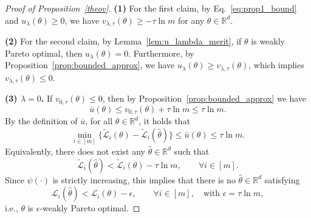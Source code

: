 \documentclass[sigconf]{acmart}
\begin{document}
\begin{proof}[Proof of Proposition~\ref{theov}]
\noindent\textbf{(1)} For the first claim, by Eq.~\eqref{eq:prop1_bound} and $u_\lambda(\theta)\geq 0$, we have $v_{\lambda,\tau}(\theta) \ge -\tau \ln m$ for any $\theta \in \mathbb{R}^d$. 

\noindent\textbf{(2)} For the second claim, by Lemma~\ref{lem:u_lambda_merit}, if $\theta$ is weakly Pareto optimal, then $u_{\lambda}(\theta)=0$. Furthermore, by Proposition~\ref{prop:bounded_approx}, we have $u_{\lambda}(\theta)\ge v_{\lambda,\tau}(\theta)$, which implies $v_{\lambda,\tau}(\theta)\le 0$.




\noindent\textbf{(3) $\lambda=0$.} If $v_{0,\tau}(\theta)\le 0$, then by Proposition~\ref{prop:bounded_approx} we have
\begin{equation}
\label{eq:prop2_casea_1}
\bar{u}(\theta) \le v_{0,\tau}(\theta)+\tau\ln m \le \tau\ln m.
\end{equation}
By the definition of $\bar{u}$, for all $\hat{\theta}\in \mathbb{R}^d$, it holds that
\begin{equation}
\label{eq:prop2_casea_2}
\min_{i\in[m]} \bigl\{\tilde{\mathcal{L}}_i(\theta)-\tilde{\mathcal{L}}_i(\hat{\theta})\bigr\} \le \bar{u}(\theta) \le \tau\ln m.
\end{equation}
Equivalently, there does not exist any $\hat{\theta}\in \mathbb{R}^d$ such that
\[
\tilde{\mathcal{L}}_i(\hat{\theta}) < \tilde{\mathcal{L}}_i(\theta) - \tau\ln m, \qquad \forall i\in[m].
\]
Since $\psi(\cdot)$ is strictly increasing, this implies that there is no $\hat{\theta}\in \mathbb{R}^d$ satisfying
\[
\mathcal{L}_i(\hat{\theta})< \mathcal{L}_i(\theta)-\epsilon, \qquad \forall i\in[m], \quad\text{with }\epsilon=\tau\ln m,
\]
i.e., $\theta$ is $\epsilon$-weakly Pareto optimal.


\end{proof}
\end{document}
